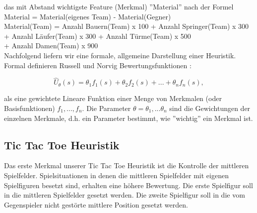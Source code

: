 das mit Abstand wichtigste Feature (Merkmal) ''Material'' nach der Formel \\

\tab \tab Material = Material(eigenes Team) - Material(Gegner) \\

Material(Team) = Anzahl Bauern(Team) x 100 + Anzahl Springer(Team) x 300 \\
\tab \tab \tab + Anzahl Läufer(Team) x 300 + Anzahl Türme(Team) x 500 \\
\tab \tab \tab + Anzahl Damen(Team) x 900 \\


Nachfolgend liefern wir eine formale, allgemeine Darstellung einer Heuristik. Formal definieren Russell und Norvig Bewertungsfunktionen \cite[218]{Russell}: 

\begin{equation*}
\hat{U}_\theta(s) = \theta_1 f_1(s) + \theta_2 f_2(s) + ... + \theta_n f_n(s),
\end{equation*}

als eine gewichtete Lineare Funktion einer Menge von Merkmalen (oder Basisfunktionen) $f_1, ..., f_n$. Die Parameter $\theta = \theta_1, ... \theta_n$ sind die Gewichtungen der einzelnen Merkmale, d.h. ein Parameter bestimmt, wie ''wichtig'' ein Merkmal ist.

\subsection{Tic Tac Toe Heuristik}
Das erste Merkmal unserer Tic Tac Toe Heuristik ist die Kontrolle der mittleren Spielfelder. Spielsituationen in denen die mittleren Spielfelder mit eigenen Spielfiguren besetzt sind, erhalten eine höhere Bewertung. Die erste Spielfigur soll in die mittleren Spielfelder gesetzt werden. Die zweite Spielfigur soll in die vom Gegenspieler nicht gestörte mittlere Position gesetzt werden. \\

